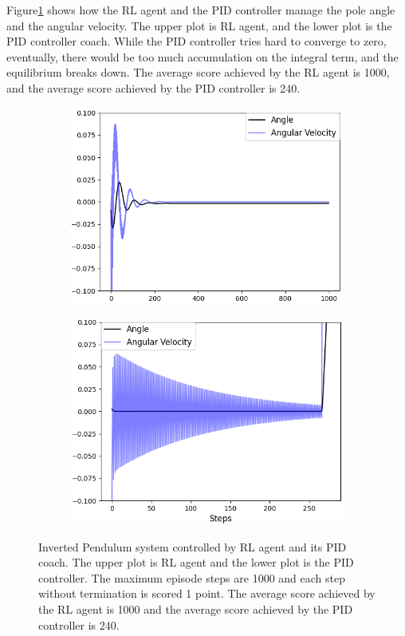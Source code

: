 \documentclass[journal]{IEEEtran}
\begin{document}
Figure\ref{fig:ip} shows how the RL agent and the PID controller manage the pole angle and the angular velocity. The upper plot is RL agent, and the lower plot is the PID controller coach. While the PID controller tries hard to converge to zero, eventually, there would be too much accumulation on the integral term, and the equilibrium breaks down. The average score achieved by the RL agent is 1000, and the average score achieved by the PID controller is 240.
\begin{figure}
\centering
\begin{subfigure}{0.3\textwidth}
  \centering
  \includegraphics[width=\linewidth]{ip_RL.png}
\end{subfigure}
\hfill
\begin{subfigure}{.3\textwidth}
  \centering
  \includegraphics[width=\linewidth]{ip_PID.png}
\end{subfigure}
\caption{Inverted Pendulum system controlled by RL agent and its PID coach. The upper plot is RL agent and the lower plot is the PID controller. The maximum episode steps are 1000 and each step without termination is scored 1 point. The average score achieved by the RL agent is 1000 and the average score achieved by the PID controller is 240.}
\label{fig:ip}
\end{figure}
\end{document}
